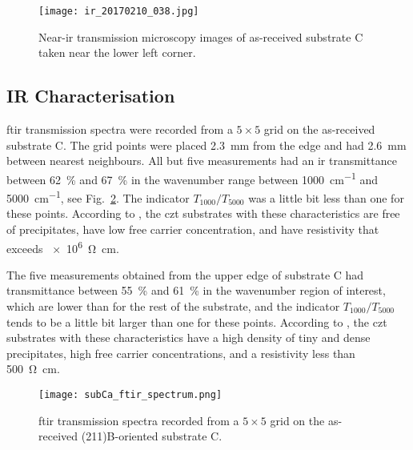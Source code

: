 \begin{figure}[htbp]
    \centering
    \texttt{[image: ir\_20170210\_038.jpg]}
    \caption[Near-\ac{ir} transmission microscopy of as-received substrate C.]{Near-\ac{ir} transmission microscopy images of as-received substrate C taken near the lower left corner.}
    \label{fig:subCa_irt}
\end{figure}

\subsection{IR Characterisation}

\Ac{ftir} transmission spectra were recorded from a $5\times5$ grid on the as-received substrate C. The grid points were placed \SI{2.3}{\milli\metre} from the edge and had \SI{2.6}{\milli\metre} between nearest neighbours. All but five measurements had an \ac{ir} transmittance between \SI{62}{\percent} and \SI{67}{\percent} in the wavenumber range between \SI{1000}{\centi\metre^{-1}} and \SI{5000}{\centi\metre^{-1}}, see Fig.~\ref{fig:subCa_ftir_spectrum}. The indicator $T_{1000}/T_{5000}$ was a little bit less than one for these points. According to \citet{yujie2004infrared}, the \ac{czt} substrates with these characteristics are free of precipitates, have low free carrier concentration, and have resistivity that exceeds \SI{e6}{\ohm\centi\metre}.

The five measurements obtained from the upper edge of substrate C had transmittance between \SI{55}{\percent} and \SI{61}{\percent} in the wavenumber region of interest, which are lower than for the rest of the substrate, and the indicator $T_{1000}/T_{5000}$ tends to be a little bit larger than one for these points. According to \citet{yujie2004infrared}, the \ac{czt} substrates with these characteristics have a high density of tiny and dense  precipitates, high free carrier concentrations, and a resistivity less than \SI{500}{\ohm\centi\metre}.

\begin{figure}[htbp]
    \centering
    \texttt{[image: subCa\_ftir\_spectrum.png]}
    \caption[\Ac{ftir} transmission spectra for the as-received substrate C.]{\Acf{ftir} transmission spectra recorded from a $5\times5$ grid on the as-received (211)B-oriented substrate C.}
    \label{fig:subCa_ftir_spectrum}
\end{figure}

